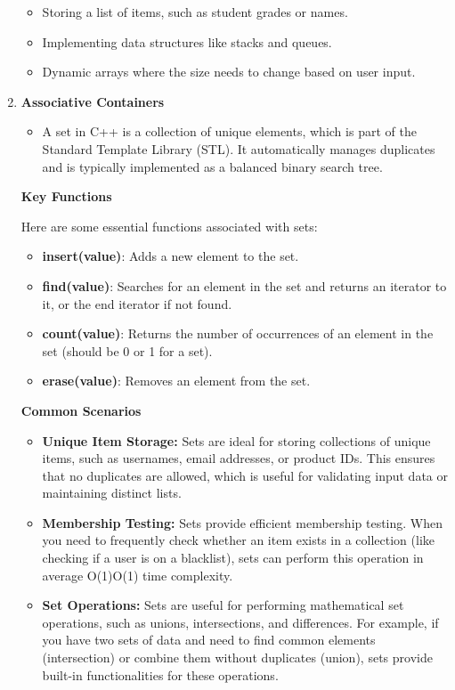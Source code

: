 \documentclass[12pt, letterpaper]{report}
\begin{document}
\begin{enumerate}
\begin{itemize}
    \item Storing a list of items, such as student grades or names.
    \item Implementing data structures like stacks and queues.
    \item Dynamic arrays where the size needs to change based on user input.
\end{itemize}

\item \textbf{Associative Containers}
	\begin{itemize}
		\item A set in C++ is a collection of unique elements, which is part of the Standard Template Library (STL). It automatically manages duplicates and is typically implemented as a balanced binary search tree.
	\end{itemize}

\textbf{Key Functions}

Here are some essential functions associated with sets:

\begin{itemize}
    \item \textbf{insert(value)}: Adds a new element to the set.
    \item \textbf{find(value)}: Searches for an element in the set and returns an iterator to it, or the end iterator if not found.
    \item \textbf{count(value)}: Returns the number of occurrences of an element in the set (should be 0 or 1 for a set).
    \item \textbf{erase(value)}: Removes an element from the set.
\end{itemize}


\textbf{Common Scenarios}
\begin{itemize}
\item \textbf{Unique Item Storage:} Sets are ideal for storing collections of unique items, such as usernames, email addresses, or product IDs. This ensures that no duplicates are allowed, which is useful for validating input data or maintaining distinct lists.

\item \textbf{Membership Testing:} Sets provide efficient membership testing. When you need to frequently check whether an item exists in a collection (like checking if a user is on a blacklist), sets can perform this operation in average O(1)O(1) time complexity.

\item \textbf{Set Operations:} Sets are useful for performing mathematical set operations, such as unions, intersections, and differences. For example, if you have two sets of data and need to find common elements (intersection) or combine them without duplicates (union), sets provide built-in functionalities for these operations.


\end{itemize}
\end{enumerate}
\end{document}
